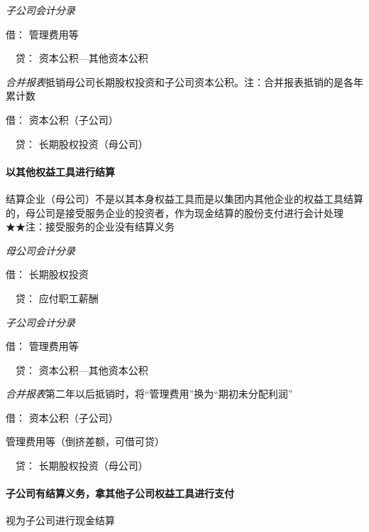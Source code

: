\documentclass[UTF8,12pt]{ctexart}
\newenvironment{Dr}{\noindent 借：}{\par}
\newenvironment{Cr}{\noindent \ \ 贷：}{\par}
\numberwithin{equation}{section} %
\numberwithin{figure}{section}
\numberwithin{table}{section}
\begin{document}
	\textit{子公司会计分录}
	
	\begin{Dr}
		管理费用等
	\end{Dr}
	\begin{Cr}
		资本公积—其他资本公积
	\end{Cr}
	
	\textit{合并报表}抵销母公司长期股权投资和子公司资本公积。注：合并报表抵销的是各年累计数
	
	\begin{Dr}
		资本公积（子公司）
	\end{Dr}
	\begin{Cr}
		长期股权投资（母公司）
	\end{Cr}
	
	\paragraph{以其他权益工具进行结算}
	结算企业（母公司）不是以其本身权益工具而是以集团内其他企业的权益工具结算的，母公司是接受服务企业的投资者，作为现金结算的股份支付进行会计处理
	★★注：接受服务的企业没有结算义务
	
	\textit{母公司会计分录}
	
	\begin{Dr}
		长期股权投资
	\end{Dr}
	\begin{Cr}
		应付职工薪酬
	\end{Cr}
	
	\textit{子公司会计分录}
	
	\begin{Dr}
		管理费用等
	\end{Dr}
	\begin{Cr}
		资本公积—其他资本公积
	\end{Cr}
	
	\textit{合并报表}第二年以后抵销时，将“管理费用”换为“期初未分配利润”
	
	\begin{Dr}
		资本公积（子公司）
		
		管理费用等（倒挤差额，可借可贷）
	\end{Dr}
	\begin{Cr}
		长期股权投资（母公司）
	\end{Cr}
	
	\paragraph{子公司有结算义务，拿其他子公司权益工具进行支付}
	视为子公司进行现金结算
	
\end{document}
